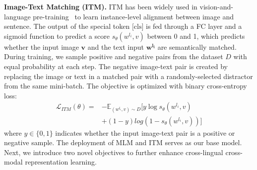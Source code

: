 \documentclass[final]{cvpr}
\newcommand{\jj}[1]{\textcolor{red}{\small{\bf [JJ: #1 ]}}}
\newcommand{\mingyang}[1]{\textcolor{brown}{\small{\bf [Mingyang: #1 ]}}}
\newcommand{\head}[1]{\noindent\textbf{#1}}
\begin{document}
\vspace{5pt}
\head{Image-Text Matching (ITM).}
ITM has been widely used in vision-and-language pre-training~\cite{UNITER, unicodervl,vilbert,su2020vlbert} to learn instance-level alignment between image and sentence.
The output of the special token $\text{[cls]}$ is fed through a FC layer and a sigmoid function to predict a score $s_\theta(w^{l_i}, v)$ between 0 and 1, which predicts whether the input image $\boldsymbol{v}$ and the text input $\boldsymbol{w^{l_i}}$ are semantically matched. During training, we sample positive and negative pairs from the dataset $D$ with equal probability at each step. The negative image-text pair is created by replacing the image or text in a matched pair with a randomly-selected distractor from the same mini-batch. The objective is optimized with binary cross-entropy loss: 
\begin{equation*}
    \begin{split}
        \mathcal{L}_{ITM}(\theta) = & - \mathbb{E}_{(w^{l_i}, v)\sim D} [y \log{s_{\theta}(w^{l_i},v)} \\
        & + (1-y)log(1-s_{\theta}(w^{l_i},v))]
    \end{split}
\end{equation*}
where $y \in \{0, 1\}$ indicates whether the input image-text pair is a positive or negative sample. The deployment of MLM and ITM serves as our base model. Next, we introduce two novel objectives to further enhance cross-lingual cross-modal representation learning.
\end{document}
